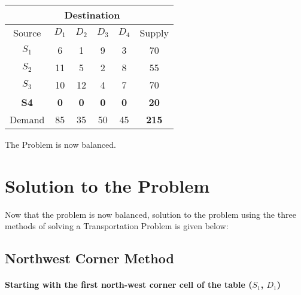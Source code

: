 \documentclass{article}
\begin{document}
		\begin{center}
			\begin{tabular}{ |c|c c c c|c| }
				\hline
				& \multicolumn{4}{|c|}{Destination} & \\
				\hline
				Source & $D_{1}$ & $D_{2}$ & $D_{3}$ & $D_{4}$ & Supply \\
				\hline
				$S_{1}$ & 6 & 1 & 9 & 3 & 70 \\
				$S_{2}$ & 11 & 5 & 2 & 8 & 55 \\
				$S_{3}$ & 10 & 12 & 4 & 7 & 70 \\
				\textbf{S4} & \textbf{0} & \textbf{0} & \textbf{0} & \textbf{0} & \textbf{20}\\
				\hline
				Demand & 85 & 35 & 50 & 45 & \cellcolor{gray}\color{white}\textbf{215}\\
				\hline
			\end{tabular}
		\end{center}
		\qquad The Problem is now balanced.

	\section*{Solution to the Problem}
		Now that the problem is now balanced, solution to the problem using the three methods of solving a Transportation Problem is given below:

		\setcounter{subsection}{0}
		\subsection{Northwest Corner Method}

			\paragraph{Starting with the first north-west corner cell of the table ($S_{1}$, $D_{1}$)}
\end{document}
